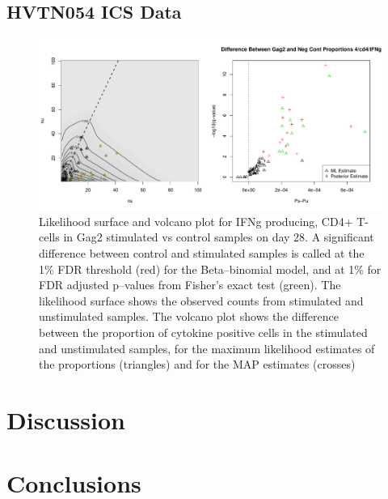 \documentclass[11pt]{article}
\begin{document}
\subsection*{HVTN054 ICS Data}
\begin{figure}[htbp] %
   \centering
   \includegraphics[width=6in]{Figures/HVTN054LikelihoodAndVolcanoplots} 
   \caption{Likelihood surface and volcano plot for IFNg producing, CD4+ T-cells in Gag2 stimulated vs control samples on day 28. A significant difference between control and stimulated samples is called at the 1\% FDR threshold (red) for the Beta--binomial model, and at 1\% for FDR adjusted p--values from Fisher's exact test (green). The likelihood surface shows the observed counts from stimulated and unstimulated samples. The volcano plot shows the difference between the proportion of cytokine positive cells in the stimulated and unstimulated samples, for the maximum likelihood estimates of the proportions (triangles) and for the MAP estimates (crosses)}
   \label{fig:icsdata}
\end{figure}

\section*{Discussion}

\section*{Conclusions}
\end{document}
